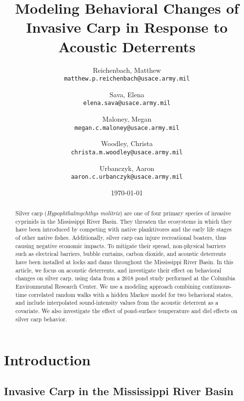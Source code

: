 \documentclass[12pt]{article}
\begin{document}
\begin{abstract}
	Silver carp (\emph{Hypophthalmychthys molitrix}) are one of four primary species of invasive cyprinids in the Mississippi River Basin. They threaten the ecosystems in which they have been introduced by competing with native planktivores and the early life stages of other native fishes. Additionally, silver carp can injure recreational boaters, thus causing negative economic impacts. To mitigate their spread, non-physical barriers such as electrical barriers, bubble curtains, carbon dioxide, and acoustic deterrents have been installed at locks and dams throughout the Mississippi River Basin. In this article, we focus on acoustic deterrents, and investigate their effect on behavioral changes on silver carp, using data from a 2018 pond study performed at the Columbia Environmental Research Center. We use a modeling approach combining continuous-time correlated random walks with a hidden Markov model for two behavioral states, and include interpolated sound-intensity values from the acoustic deterrent as a covariate. We also investigate the effect of pond-surface temperature and diel effects on silver carp behavior.
\end{abstract}

\title{Modeling Behavioral Changes of Invasive Carp in Response to Acoustic Deterrents}
\author{
	Reichenbach, Matthew \\
	\texttt{matthew.p.reichenbach@usace.army.mil}
	\and
	Sava, Elena \\
	\texttt{elena.sava@usace.army.mil}
	\and
	Maloney, Megan \\
	\texttt{megan.c.maloney@usace.army.mil}
	\and
	Woodley, Christa \\
	\texttt{christa.m.woodley@usace.army.mil}
	\and
	Urbanczyk, Aaron \\
	\texttt{aaron.c.urbanczyk@usace.army.mil}
}
\date{\today}

\maketitle

\section{Introduction}

\subsection{Invasive Carp in the Mississippi River Basin}
\end{document}
